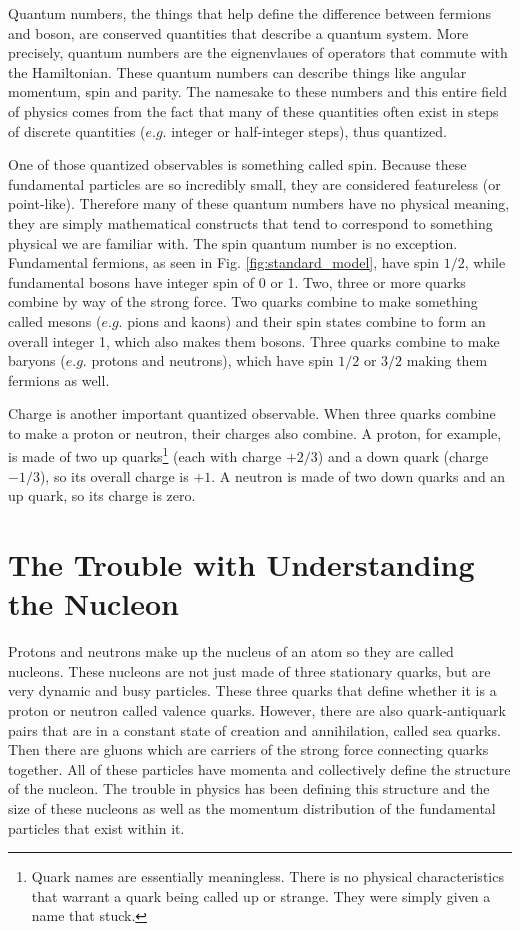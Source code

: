Quantum numbers, the things that help define the difference between fermions and boson, are conserved quantities that describe a quantum system. More precisely, quantum numbers are the eignenvlaues of operators that commute with the Hamiltonian. These quantum numbers can describe things like angular momentum, spin and parity. The namesake to these numbers and this entire field of physics comes from the fact that many of these quantities often exist in steps of discrete quantities ($e.g.$ integer or half-integer steps), thus quantized.

One of those quantized observables is something called spin. Because these fundamental particles are so incredibly small, they are considered featureless (or point-like). Therefore many of these quantum numbers have no physical meaning, they are simply mathematical constructs that tend to correspond to something physical we are familiar with. The spin quantum number is no exception. Fundamental fermions, as seen in Fig. \ref{fig:standard_model}, have spin $1/2$, while fundamental bosons have integer spin of 0 or 1. Two, three or more quarks combine by way of the strong force. Two quarks combine to make something called mesons ($e.g.$ pions and kaons) and their spin states combine to form an overall integer 1, which also makes them bosons. Three quarks combine to make baryons ($e.g.$ protons and neutrons), which have spin $1/2$ or $3/2$ making them fermions as well.

Charge is another important quantized observable. When three quarks combine to make a proton or neutron, their charges also combine. A proton, for example, is made of two up quarks\footnote{Quark names are essentially meaningless. There is no physical characteristics that warrant a quark being called up or strange. They were simply given a name that stuck.} (each with charge $+2/3$) and a down quark (charge $-1/3$), so its overall charge is $+1$. A neutron is made of two down quarks and an up quark, so its charge is zero.

\section{The Trouble with Understanding the Nucleon}
Protons and neutrons make up the nucleus of an atom so they are called nucleons. These nucleons are not just made of three stationary quarks, but are very dynamic and busy particles. These three quarks that define whether it is a proton or neutron called valence quarks. However, there are also quark-antiquark pairs that are in a constant state of creation and annihilation, called sea quarks. Then there are gluons which are carriers of the strong force connecting quarks together. All of these particles have momenta and collectively define the structure of the nucleon. The trouble in physics has been defining this structure and the size of these nucleons as well as the momentum distribution of the fundamental particles that exist within it.

